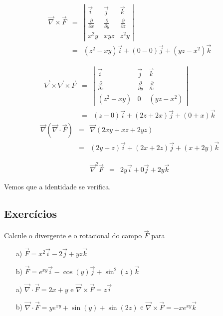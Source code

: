 \begin{resol}


 \begin{eqnarray*}
   \vec{\nabla}\times \vec{F}&=&\left|
   \begin{array}{ccc}
    \vec{i}&\vec{j}&\vec{k}\\[.5cm]
    \frac{\partial }{\partial x}&\frac{\partial }{\partial y}&\frac{\partial }{\partial z}\\[.5cm]
    x^2y&xyz&z^2y
   \end{array}\right|\\
   &=&\left(z^2-xy\right)\vec{i}+\left(0-0\right)\vec{j}+\left(yz-x^2\right)\vec{k}
 \end{eqnarray*}

 \begin{eqnarray*}
   \vec{\nabla}\times\vec{\nabla}\times \vec{F}&=&\left|
   \begin{array}{ccc}
    \vec{i}&\vec{j}&\vec{k}\\[.5cm]
    \frac{\partial }{\partial x}&\frac{\partial }{\partial y}&\frac{\partial }{\partial z}\\[.5cm]
    (z^2-xy)&0&(yz-x^2)
   \end{array}\right|\\
   &=&\left(z-0\right)\vec{i}+\left(2z+2x\right)\vec{j}+\left(0+x\right)\vec{k}
 \end{eqnarray*}
 \begin{eqnarray*}
  \vec{\nabla}(\vec{\nabla}\cdot\vec{F})&=&\vec{\nabla}(2xy+xz+2yz)\\
  &=&(2y+z)\vec{i}+(2x+2z)\vec{j}+(x+2y)\vec{k}
 \end{eqnarray*}

\begin{eqnarray*}
  \vec{\nabla}^2\vec{F}&=&2y\vec{i}+0\vec{j}+2y\vec{k}
 \end{eqnarray*}

 Vemos que a identidade se verifica.

\end{resol}


 \subsection*{Exercícios}
\begin{exer}
 Calcule o divergente e o rotacional do campo $\vec{F}$ para
 \begin{itemize}
  \item[a)] $\vec{F}=x^2\vec{i}-2\vec{j}+yz\vec{k}$
  \item[b)] $\vec{F}=e^{xy}\vec{i}-\cos(y)\vec{j}+\sin^2(z)\vec{k}$
 \end{itemize}
\end{exer}
\begin{resp}
 \begin{itemize}
  \item[a)] $\vec{\nabla}\cdot\vec{F}=2x+y$ e $\vec{\nabla}\times \vec{F}=z\vec{i}$
  \item[b)] $\vec{\nabla}\cdot\vec{F}=ye^{xy}+\sin(y)+\sin(2z)$ e $\vec{\nabla}\times \vec{F}=-xe^{xy}\vec{k}$
 \end{itemize}
\end{resp}

